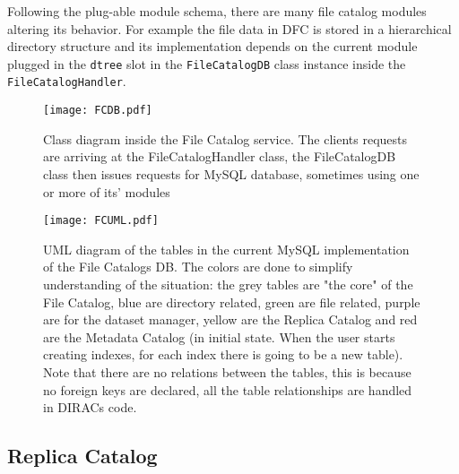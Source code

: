 Following the plug-able module schema, there are many file catalog modules altering its behavior. For example the 
file data in DFC is stored in a hierarchical directory structure and its implementation depends on the current
module plugged in the \texttt{dtree} slot in the \texttt{FileCatalogDB} class instance inside the 
\texttt{FileCatalogHandler}. 

\begin{figure}[h]
	\centering
	\texttt{[image: FCDB.pdf]}
	\caption{Class diagram inside the File Catalog service. The clients requests are arriving at the 
	FileCatalogHandler class, the FileCatalogDB class then issues requests for MySQL database, sometimes using one
	or more of its' modules}
	\label{fig:FCClasses}
\end{figure}

\begin{figure}[b]
	\centering
	\texttt{[image: FCUML.pdf]}
	\caption{UML diagram of the tables in the current MySQL implementation of the File Catalogs DB. The colors are
	done to simplify understanding of the situation: the grey tables are "the core" of the File Catalog, blue are
	directory related, green are file related, purple are for the dataset manager, yellow are the Replica Catalog
	and red are the Metadata Catalog (in initial state. When the user starts creating indexes, for each 
	index there is going to be a new table). Note that there are no relations between the tables, this is because
	no foreign keys are declared, all the table relationships are handled in DIRACs code.}
	\label{fig:FCMySQLUML}
\end{figure}



\subsection{Replica Catalog}

